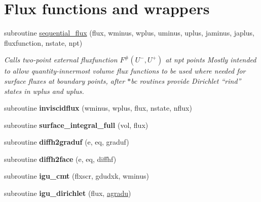 \hypertarget{group__flux}{\section{Flux functions and wrappers}
\label{group__flux}
}
\begin{DoxyCompactItemize}
\item 
subroutine \hyperlink{group__flux_ga4498a8903b8de21f2c0afd0d34c5e00c}{sequential\-\_\-flux} (flux, wminus, wplus, uminus, uplus, jaminus, japlus, fluxfunction, nstate, npt)
\begin{DoxyCompactList}\small\item\em Calls two-\/point external fluxfunction $F^{\#}(U^-,U^+)$ at npt points Mostly intended to allow quantity-\/innermost volume flux functions to be used where needed for surface fluxes at boundary points, after $\ast$bc routines provide Dirichlet ``rind'' states in wplus and uplus. \end{DoxyCompactList}\item 
\hypertarget{group__flux_ga07b6f239f6de61d489a639234c55dac3}{subroutine {\bfseries inviscidflux} (wminus, wplus, flux, nstate, nflux)}\label{group__flux_ga07b6f239f6de61d489a639234c55dac3}

\item 
\hypertarget{group__flux_ga799332814e9d69e56ae5cc53dd448ebc}{subroutine {\bfseries surface\-\_\-integral\-\_\-full} (vol, flux)}\label{group__flux_ga799332814e9d69e56ae5cc53dd448ebc}

\item 
\hypertarget{group__flux_ga88fa0428bc395bf4e785ac7c484fc587}{subroutine {\bfseries diffh2graduf} (e, eq, graduf)}\label{group__flux_ga88fa0428bc395bf4e785ac7c484fc587}

\item 
\hypertarget{group__flux_ga41a0b6638f2086e785a2eee46c838140}{subroutine {\bfseries diffh2face} (e, eq, diffhf)}\label{group__flux_ga41a0b6638f2086e785a2eee46c838140}

\item 
\hypertarget{group__flux_ga28b5864db9a8cc5516dff0524e5281dd}{subroutine {\bfseries igu\-\_\-cmt} (flxscr, gdudxk, wminus)}\label{group__flux_ga28b5864db9a8cc5516dff0524e5281dd}

\item 
\hypertarget{group__flux_ga9e1df29c0b6ddab6d384439c68f98361}{subroutine {\bfseries igu\-\_\-dirichlet} (flux, \hyperlink{group__vfjac_ga9087d56c6c467d3ffeb9aa6be3f43e82}{agradu})}\label{group__flux_ga9e1df29c0b6ddab6d384439c68f98361}


\end{DoxyCompactItemize}
